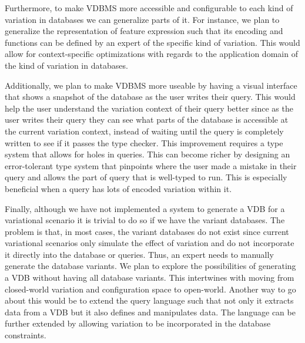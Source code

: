 %
Furthermore, to make VDBMS more accessible and configurable to each 
kind of variation in databases we can generalize parts of it. For instance, 
we plan to generalize the representation of feature expression  such that its encoding and functions
can be defined by an expert of the specific kind of variation. This would allow
for context-specific optimizations with regards to the application domain 
of the kind of variation in databases.

%
Additionally, we plan to make VDBMS more useable by having a visual 
interface that shows a snapshot of the database as the user writes their
query. This would help the user understand the variation context of their 
query better since as the user writes their query they can see what parts
of the database is accessible at the current variation context, instead of waiting until 
the query is completely written to see if it passes the type checker.
%
This improvement requires a type system that allows for holes in queries.
This can become richer by 
designing an error-tolerant type system that pinpoints
where the user made a mistake in their query and allows the part of
query that is well-typed to run. This is especially beneficial when a query has lots of 
encoded variation within it. 

%
Finally, although we have not implemented a system to generate a VDB for 
a variational scenario it is trivial to do so if we have the variant databases.
The problem is that, in most cases, the variant databases do not exist
since current variational scenarios only simulate the effect of variation
and do not incorporate it directly into the database or queries.
Thus, an expert needs to manually generate the database variants.
%
We plan to explore the possibilities of generating a VDB without 
having all database variants. This intertwines with moving from closed-world
variation and configuration space to open-world. 
%
Another way to go about this would be to extend the query language such that 
not only it extracts data from a VDB but it also defines and manipulates data.
The language can be further extended by allowing variation to be incorporated 
in the database constraints.



